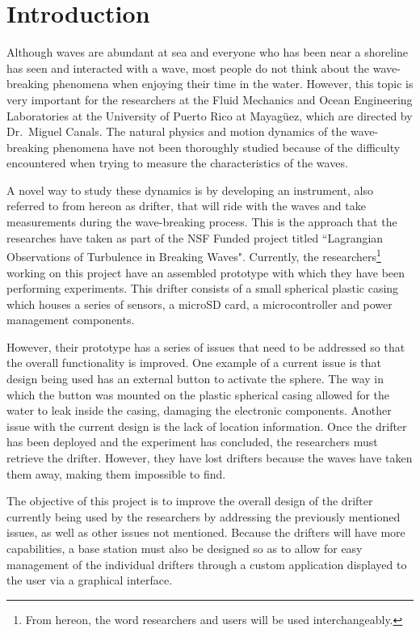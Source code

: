 \section{Introduction}

Although waves are abundant at sea and everyone who has been near a shoreline has seen and interacted with a wave, most people do not think about the wave-breaking phenomena when enjoying their time in the water.  However, this topic is very important for the researchers at the Fluid Mechanics and Ocean Engineering Laboratories at the University of Puerto Rico at Mayag\"uez, which are directed by Dr.~Miguel Canals.  The natural physics and motion dynamics of the wave-breaking phenomena have not been thoroughly studied because of the difficulty encountered when trying to measure the characteristics of the waves.

A novel way to study these dynamics is by developing an instrument, also referred to from hereon as drifter, that will ride with the waves and take measurements during the wave-breaking process.  This is the approach that the researches have taken as part of the NSF Funded project titled ``Lagrangian Observations of Turbulence in Breaking Waves".  Currently, the researchers\footnote{From hereon, the word researchers and users will be used interchangeably.} working on this project have an assembled prototype with which they have been performing experiments. This drifter consists of a small spherical plastic casing which houses a series of sensors, a microSD card, a microcontroller and power management components.

However, their prototype has a series of issues that need to be addressed so that the overall functionality is improved.  One example of a current issue is that design being used has an external button to activate the sphere.  The way in which the button was mounted on the plastic spherical casing allowed for the water to leak inside the casing, damaging the electronic components.  Another issue with the current design is the lack of location information. Once the drifter has been deployed and the experiment has concluded, the researchers must retrieve the drifter.  However, they have lost drifters because the waves have taken them away, making them impossible to find.

The objective of this project is to improve the overall design of the drifter currently being used by the researchers by addressing the previously mentioned issues, as well as other issues not mentioned.  Because the drifters will have more capabilities, a base station must also be designed so as to allow for easy management of the individual drifters through a custom application displayed to the user via a graphical interface. 

